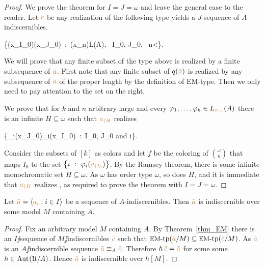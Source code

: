 \documentclass[creche.tex]{subfiles}
\begin{document}
\begin{proof}
We prove the theorem for $I=J=\omega$ and leave the general case to the reader.
Let ${\color{brown}\bar c}$ be any realization of the following type yields a $J$-sequence of $A$-indiscernibles.

{\cup}
{\Big\{\phi({\mr x_{\restriction I_0}})\iff\phi({\mr x_{\restriction J_0}})\ :\  \phi({\mr x_{\restriction n}})\in L(A), \ I_0, J_0, \ n<\omega\Big\}.}

We will prove that any finite subset of the type above is realized by a finite subsequence of ${\color{brown}\bar a}$.
First note that any finite subset of $q({\color{brown}\bar x})$ is realized by any subsequence of ${\color{brown}\bar a}$ of the proper length by the definition of EM-type.
Then we only need to pay attention to the set on the right.

We prove that for $k$ and $n$ arbitrary large and every $\varphi_1,\dots,\varphi_k\in L_{\color{brown} x_{\restriction n}}(A)$ there is an infinite $H\subseteq\omega$ such that ${\color{brown} a_{\restriction H}}$ realizes

\ceq{\ssf{\#}}
{}
{\Big\{\phi_i({\mr x_{\restriction J_0}})\iff\phi_i({\mr x_{\restriction I_0}})\ :\  I_0, J_0\textrm{ and } i\in[k]\Big\}.}

Consider the subsets of $[k]$ as colors and let $f$ be the coloring of ${\omega\choose n}$ that maps $I_0$ to the set $\big\{i\ :\ \varphi_i({\color{brown} a_{\restriction I_0}})\big\}$.
By the Ramsey theorem,
there is some infinite monochromatic set $H\subseteq\omega$.
As $\omega$ has order type $\omega$,
so does $H$,
and it is immediate that ${\color{brown} a_{\restriction H}}$ realizes \ssf{\#},
as required to prove the theorem with $I=J=\omega$.
\end{proof}


\begin{proposition}\label{prop_indiscernibles_set_model}
  Let ${\color{brown}\bar a}=\langle{\color{brown}a_i}:i\in I\rangle$ be a sequence of $A$-indiscernibles.
Then ${\color{brown}\bar a}$ is indiscernible over some model $M$ containing $A$.
\end{proposition}

\begin{proof}
  Fix an arbitrary model $M$ containing $A$.
By Theorem~\ref{thm_EM} there is an $I\jj$sequence of $M\jj$indiscernibles ${\color{brown}\bar c}$ such that $\textrm{{\small EM}\mbox{-}tp}({\color{brown}\bar a}/M)\subseteq\textrm{{\small EM}\mbox{-}tp}({\color{brown}\bar c}/M)$.
As ${\color{brown}\bar a}$ is an $A\jj$indiscernible sequence ${\color{brown}\bar a}\equiv_A{\color{brown}\bar c}$.
Therefore $h\,{\color{brown}\bar c}={\color{brown}\bar a}$ for some some $h\in\textrm{Aut\kern.15ex}(\EuScript U/A)$.
Hence ${\color{brown}\bar a}$ is indiscernible over $h[M]$.
\end{proof}
\end{document}
